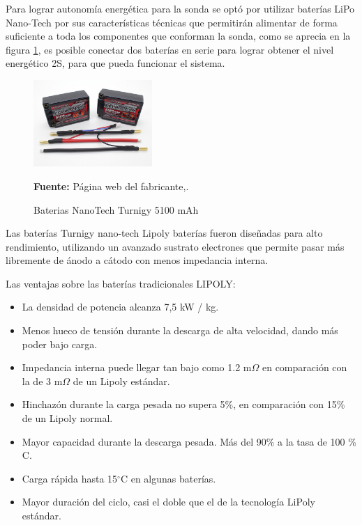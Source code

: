 Para lograr autonom\'ia energ\'etica para la sonda se opt\'o por utilizar bater\'ias LiPo Nano-Tech por sus caracter\'isticas t\'ecnicas que permitir\'an alimentar de forma suficiente a toda los componentes que conforman la sonda, como se aprecia en la figura \ref{fig:nanoBateria}, es posible conectar dos baterías en serie para lograr obtener el nivel energético 2S, para que pueda funcionar el sistema.  
    \begin{figure}[H]
        \centering
        \includegraphics[width=0.4\textwidth]{Imagenes/2021/imag29.jpg}
        \caption{Baterias NanoTech Turnigy 5100 mAh}\textbf{Fuente:} P\'agina web del fabricante,\cite{bateria}.
        \label{fig:nanoBateria}
    \end{figure}
Las bater\'ias Turnigy nano-tech Lipoly bater\'ias fueron dise\~nadas para alto rendimiento, utilizando un avanzado sustrato electrones que permite pasar m\'as libremente de \'anodo a c\'atodo con menos impedancia interna.
 
Las ventajas sobre las bater\'ias tradicionales LIPOLY:
\begin{itemize}
    \item La densidad de potencia alcanza 7,5 kW / kg.
    \item Menos hueco de tensi\'on durante la descarga de alta velocidad, dando m\'as poder bajo carga.
    \item Impedancia interna puede llegar tan bajo como 1.2 m${\Omega }$ en comparación con la de 3 m${\Omega }$ de un Lipoly estándar.
    \item Hinchazón durante la carga pesada no supera 5\%, en comparación con 15\% de un Lipoly normal.
    \item Mayor capacidad durante la descarga pesada. M\'as del 90\% a la tasa de 100 \% C.
    \item Carga r\'apida hasta 15$^{\circ}$C en algunas baterías.
    \item Mayor duraci\'on del ciclo, casi el doble que el de la tecnolog\'ia LiPoly est\'andar.
\end{itemize}

